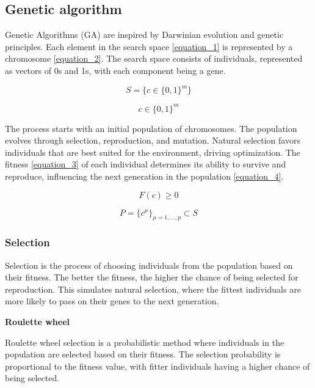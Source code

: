 \documentclass[11pt, a4paper]{article}
\begin{document}
\subsection{Genetic algorithm}

Genetic Algorithms (GA) are inspired by Darwinian evolution and genetic principles. Each element in the search space \eqref{equation_1} is represented by a 
chromosome \eqref{equation_2}. The search space consists of individuals, represented as vectors of 0s and 1s, with each component being a gene.

\begin{equation}
    S = \{c \in \{0, 1\}^{m}\}
    \label{equation_1}
\end{equation}

\begin{equation}
   c \in \{0, 1\}^{m}
    \label{equation_2}
\end{equation}

The process starts with an initial population of chromosomes. The population evolves through selection, reproduction, and mutation. Natural selection favors 
individuals that are best suited for the environment, driving optimization. The fitness \eqref{equation_3} of each individual determines its ability to survive and reproduce, 
influencing the next generation in the population \eqref{equation_4}.

\begin{equation}
    F(c) \geq 0
    \label{equation_3}
\end{equation}

\begin{equation}
    P = \{c^{\mu}\}_{\mu=1,...,p} \subset S
    \label{equation_4}
\end{equation}

\subsubsection{Selection}

Selection \cite{WikipediaSelection} is the process of choosing individuals from the population based on their fitness. The better the fitness, the higher the chance of being 
selected for reproduction. This simulates natural selection, where the fittest individuals are more likely to pass on their genes to the next generation.

\vspace{1em}\textbf{Roulette wheel}

Roulette wheel selection is a probabilistic method where individuals in the population are selected based on their fitness. The selection probability is proportional to the 
fitness value, with fitter individuals having a higher chance of being selected.
\end{document}
